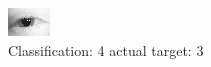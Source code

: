 \begin{figure}[h!]
\begin{center}
\includegraphics[width=0.60\columnwidth]{figures/ID62_class_4_target_3.png}
\end{center}
\caption{ Classification: 4 actual target: 3}
\label{fig:ID62_class_4_target_3}
\end{figure}
